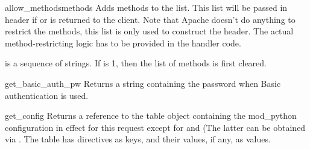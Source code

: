 \begin{methoddesc}[Request]{allow_methods}{methods}
Adds methods to the  list. This list
will be passed in  header if
 or 
is returned to the client. Note that Apache doesn't do anything to
restrict the methods, this list is only used to construct the
header. The actual method-restricting logic has to be provided in the
handler code.

 is a sequence of strings. If  is 1, then
the list of methods is first cleared.
\end{methoddesc}

\begin{methoddesc}[Request]{get_basic_auth_pw}{}
Returns a string containing the password when Basic authentication is
used.
\end{methoddesc}

\begin{methoddesc}[Request]{get_config}{}
Returns a reference to the table object containing the mod_python
configuration in effect for this request except for
 and  (The latter can be
obtained via . The table has directives as
keys, and their values, if any, as values.
\end{methoddesc}

